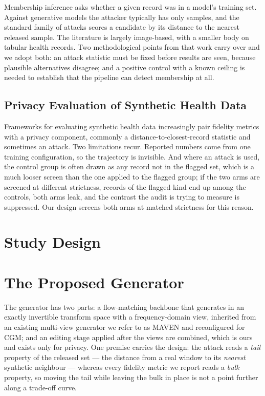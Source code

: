 \documentclass[journal]{IEEEtran}
\begin{document}
Membership inference asks whether a given record was in a model's training set. Against
generative models the attacker typically has only samples, and the standard family of
attacks scores a candidate by its distance to the nearest released sample. The
literature is largely image-based, with a smaller body on tabular health records. Two
methodological points from that work carry over and we adopt both: an attack statistic
must be fixed before results are seen, because plausible alternatives disagree; and a
positive control with a known ceiling is needed to establish that the pipeline can
detect membership at all.

\subsection{Privacy Evaluation of Synthetic Health Data}

Frameworks for evaluating synthetic health data increasingly pair fidelity metrics with
a privacy component, commonly a distance-to-closest-record statistic and sometimes an
attack. Two limitations recur. Reported numbers come from one training configuration, so
the trajectory is invisible. And where an attack is used, the control group is often
drawn as any record not in the flagged set, which is a much looser screen than the one
applied to the flagged group; if the two arms are screened at different strictness,
records of the flagged kind end up among the controls, both arms leak, and the contrast
the audit is trying to measure is suppressed. Our design screens both arms at matched
strictness for this reason.

\section{Study Design}

\section{The Proposed Generator}

The generator has two parts: a flow-matching backbone that generates in an exactly
invertible transform space with a frequency-domain view, inherited from an existing
multi-view generator we refer to as MAVEN and reconfigured for CGM; and an editing stage
applied after the views are combined, which is ours and exists only for privacy. One premise
carries the design: the attack reads a \emph{tail} property of the released set --- the
distance from a real window to its \emph{nearest} synthetic neighbour --- whereas every
fidelity metric we report reads a \emph{bulk} property, so moving the tail while leaving the
bulk in place is not a point further along a trade-off curve.
\end{document}

